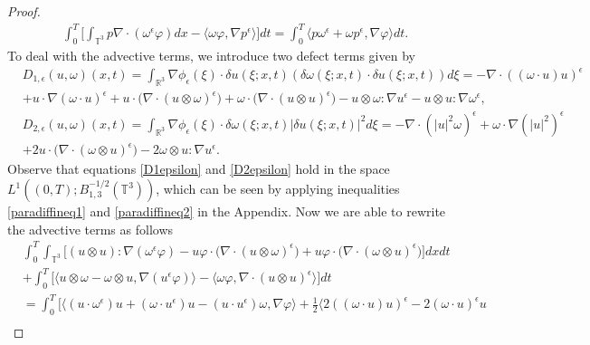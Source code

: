 \documentclass[12pt,a4paper]{article}
\theoremstyle{definition}
\theoremstyle{remark}
\numberwithin{equation}{section}
\begin{document}
\begin{proof}
\begin{align*}
\int_0^T \bigg[ \int_{\mathbb{T}^3} p \nabla \cdot (\omega^\epsilon \varphi) dx - \langle \omega \varphi, \nabla p^\epsilon \rangle \bigg] dt = \int_0^T \langle p \omega^\epsilon + \omega p^\epsilon, \nabla \varphi \rangle dt.
\end{align*}
To deal with the advective terms, we introduce two defect terms given by
\begin{align}
&D_{1,\epsilon} (u, \omega) (x,t) = \int_{\mathbb{R}^3} \nabla \phi_\epsilon (\xi) \cdot \delta u (\xi ; x,t) (\delta \omega (\xi ;x,t) \cdot \delta u (\xi ; x, t) ) d \xi = - \nabla \cdot ( (\omega \cdot u) u)^\epsilon \nonumber \\
&+ u \cdot \nabla (\omega \cdot u)^\epsilon + u \cdot \big( \nabla \cdot (u \otimes \omega)^\epsilon \big) + \omega \cdot \big( \nabla \cdot (u \otimes u)^\epsilon \big) - u \otimes \omega : \nabla u^\epsilon - u \otimes u : \nabla \omega^\epsilon, \label{D1epsilon} \\
&D_{2,\epsilon} (u, \omega) (x,t) = \int_{\mathbb{R}^3} \nabla \phi_\epsilon (\xi) \cdot \delta \omega (\xi ; x,t) \lvert \delta u (\xi ;x,t) \rvert^2 d \xi = - \nabla \cdot ( \lvert u \rvert^2 \omega)^\epsilon + \omega \cdot \nabla (\lvert u \rvert^2 )^\epsilon \nonumber \\
&+ 2 u \cdot \big( \nabla \cdot (\omega \otimes u)^\epsilon \big) - 2 \omega \otimes u : \nabla u^\epsilon. \label{D2epsilon}
\end{align}
Observe that equations \eqref{D1epsilon} and \eqref{D2epsilon} hold in the space $L^1 ((0,T);B^{-1/2}_{1,3}(\mathbb{T}^3))$, which can be seen by applying inequalities \eqref{paradiffineq1} and \eqref{paradiffineq2} in the Appendix. Now we are able to rewrite the advective terms as follows
\begingroup
\allowdisplaybreaks
\begin{align*}
&\int_0^T \int_{\mathbb{T}^3} \bigg[ (u \otimes u) : \nabla (\omega^\epsilon \varphi)  -  u \varphi \cdot \big(\nabla \cdot (u \otimes \omega)^\epsilon \big) +  u \varphi \cdot \big(\nabla \cdot (\omega \otimes u)^\epsilon \big) \bigg] dx dt \\
&+ \int_0^T \bigg[ \langle u \otimes \omega - \omega \otimes u, \nabla (u^\epsilon \varphi ) \rangle - \langle \omega \varphi, \nabla \cdot ( u \otimes u)^\epsilon \rangle \bigg] dt \\
&= \int_0^T \bigg[ \bigg\langle (u \cdot \omega^\epsilon) u + (\omega \cdot u^\epsilon) u - (u \cdot u^\epsilon) \omega , \nabla \varphi \bigg\rangle + \frac{1}{2} \bigg\langle 2((\omega \cdot u) u)^\epsilon - 2(\omega \cdot u)^\epsilon u \\

\end{align*}
\end{proof}
\end{document}
